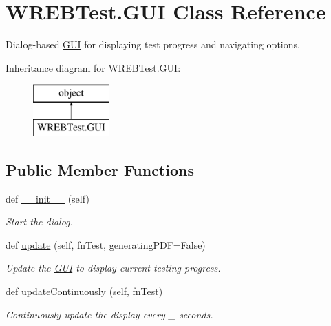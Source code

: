 \hypertarget{class_w_r_e_b_test_1_1_g_u_i}{}\section{W\+R\+E\+B\+Test.\+G\+UI Class Reference}
\label{class_w_r_e_b_test_1_1_g_u_i}


Dialog-\/based \hyperlink{class_w_r_e_b_test_1_1_g_u_i}{G\+UI} for displaying test progress and navigating options.  


Inheritance diagram for W\+R\+E\+B\+Test.\+G\+UI\+:\begin{figure}[H]
\begin{center}
\leavevmode
\includegraphics[height=2.000000cm]{class_w_r_e_b_test_1_1_g_u_i}
\end{center}
\end{figure}
\subsection*{Public Member Functions}
\begin{DoxyCompactItemize}
\item 
def \hyperlink{class_w_r_e_b_test_1_1_g_u_i_af16c984b23c92fbd1c31ef7e7f7528f6}{\+\_\+\+\_\+init\+\_\+\+\_\+} (self)
\begin{DoxyCompactList}\small\item\em Start the dialog. \end{DoxyCompactList}\item 
def \hyperlink{class_w_r_e_b_test_1_1_g_u_i_a6f9d70bcdf483cc55920068feacb8472}{update} (self, fn\+Test, generating\+P\+DF=False)
\begin{DoxyCompactList}\small\item\em Update the \hyperlink{class_w_r_e_b_test_1_1_g_u_i}{G\+UI} to display current testing progress. \end{DoxyCompactList}\item 
def \hyperlink{class_w_r_e_b_test_1_1_g_u_i_abf4a962a7a5b1da66157a96916bab756}{update\+Continuously} (self, fn\+Test)
\begin{DoxyCompactList}\small\item\em Continuously update the display every \+\_\+ seconds. \end{DoxyCompactList}\end{DoxyCompactItemize}


